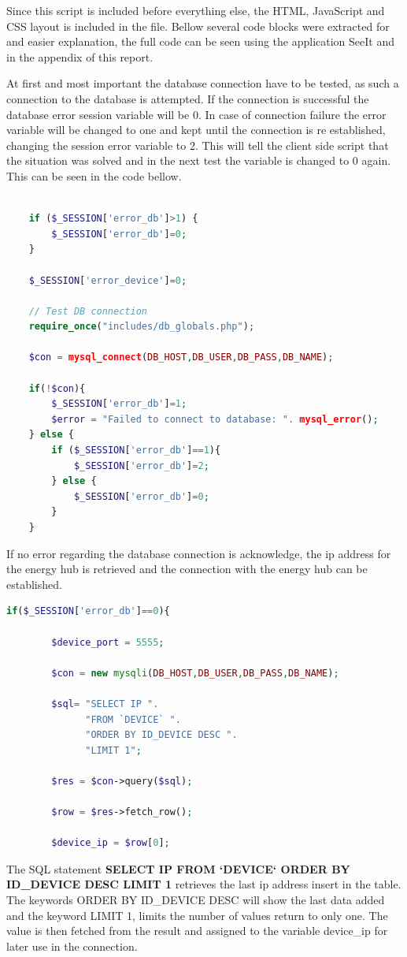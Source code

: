 Since this script is included before everything else, the HTML, JavaScript and CSS layout is included in the file. Bellow several code blocks were extracted for and easier explanation, the full code can be seen using the application SeeIt and in the appendix of this report.

At first and most important the database connection have to be tested, as such a connection to the database is attempted. If the connection is successful the database error session variable will be 0. In case of connection failure the error variable will be changed to one and kept until the connection is re established, changing the session error variable to 2. This will tell the client side script that the situation was solved and in the next test the variable is changed to 0 again. This can be seen in the code bellow.
\begin{lstlisting}[language=php]
	
	if ($_SESSION['error_db']>1) { 
		$_SESSION['error_db']=0;
	}

	$_SESSION['error_device']=0;

	// Test DB connection
	require_once("includes/db_globals.php");
	
	$con = mysql_connect(DB_HOST,DB_USER,DB_PASS,DB_NAME);
	
	if(!$con){
		$_SESSION['error_db']=1;
		$error = "Failed to connect to database: ". mysql_error();
	} else {
		if ($_SESSION['error_db']==1){
			$_SESSION['error_db']=2;
		} else {
			$_SESSION['error_db']=0;	
		}
	}
\end{lstlisting}

If no error regarding the database connection is acknowledge, the ip address for the energy hub is retrieved and the connection with the energy hub can be established.

\begin{lstlisting}[language=php]
if($_SESSION['error_db']==0){
		
		$device_port = 5555;
		
		$con = new mysqli(DB_HOST,DB_USER,DB_PASS,DB_NAME);
		
		$sql= "SELECT IP ". 
			  "FROM `DEVICE` ". 
			  "ORDER BY ID_DEVICE DESC ".
			  "LIMIT 1";
		
		$res = $con->query($sql);
		
		$row = $res->fetch_row();
		
		$device_ip = $row[0];
\end{lstlisting}

The SQL statement  \textbf{SELECT IP FROM `DEVICE` ORDER BY ID\_DEVICE DESC LIMIT 1} retrieves the last ip address insert in the table. The keywords ORDER BY ID\_DEVICE DESC will show the last data added and the keyword LIMIT 1, limits the number of values return to only one. The value is then fetched from the result and assigned to the variable device\_ip for later use in the connection.

